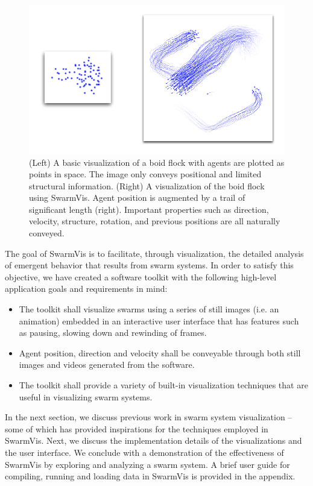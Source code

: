 \documentclass{vgtc}
\begin{document}
\begin{figure}[ht]
\centering
\includegraphics[scale=.55]{images/intro.pdf}
\caption{(Left) A basic visualization of a boid flock with agents are plotted as
points in space. The image only conveys positional and limited structural information.
(Right) A visualization of the boid flock using SwarmVis. Agent
position is augmented by a trail of significant length (right).
Important properties such as direction, velocity, structure, rotation,
and previous positions are all naturally conveyed.
}
\label{Intro}
\end{figure}

The goal of SwarmVis is to facilitate, through visualization, the detailed analysis of emergent behavior that results from swarm systems.
In order to satisfy this objective, we have created a software toolkit
with the following high-level application goals and requirements in mind:
\begin{itemize}
\item The toolkit shall visualize swarms using a series of still images (i.e. an animation)
embedded in an interactive user interface that has features such as pausing, slowing down and rewinding of frames.
\item Agent position, direction and velocity shall be conveyable through both still images and videos generated from the software.
\item The toolkit shall provide a variety of built-in visualization techniques that are useful in visualizing swarm systems.
\end{itemize}

In the next section, we discuss previous work in swarm system visualization --
some of which has provided inspirations for the techniques employed in SwarmVis.
Next, we discuss the implementation details of the visualizations and the user interface.
We conclude with a demonstration of the effectiveness of SwarmVis by exploring and analyzing a swarm system.
A brief user guide for compiling, running and loading data in SwarmVis is provided in the appendix.
\end{document}
